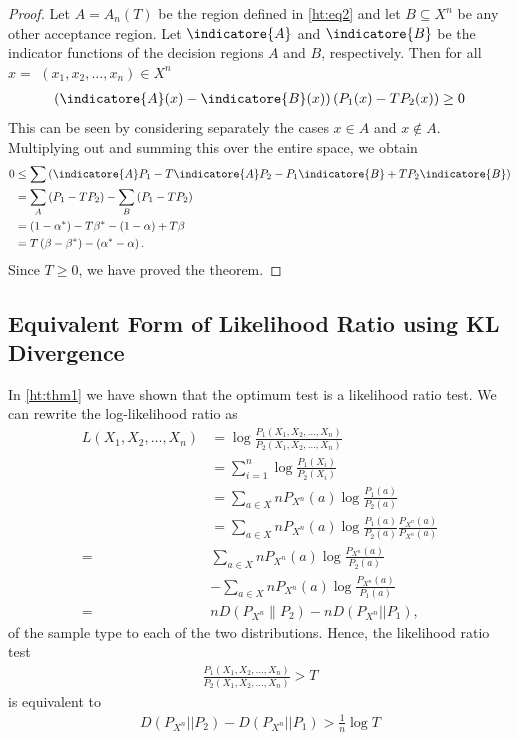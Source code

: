 \documentclass{article}
\begin{document}
\begin{proof}
Let $A=A_{n}(T)$ be the region defined in \cref{ht:eq2} and let $B \subseteq X ^{n}$ be any other acceptance region. Let $\indicatore{A}$ and $\indicatore{B}$ be the indicator functions of the decision regions $A$ and $B$, respectively. Then for all $x =$ $\left(x_{1}, x_{2}, \ldots, x_{n}\right) \in X ^{n}$
\begin{align*}
\left(\indicatore{A}( x )-\indicatore{B}( x )\right)\left(P_{1}( x )-T P_{2}( x )\right) \geq 0
\end{align*}
This can be seen by considering separately the cases $x \in A$ and $x \notin A$. Multiplying out and summing this over the entire space, we obtain
\begin{align*}
0 &\leq \sum\left(\indicatore{A} P_{1}-T \indicatore{A} P_{2}-P_{1} \indicatore{B}+T P_{2} \indicatore{B}\right)\\
&=\sum_{A}\left(P_{1}-T P_{2}\right)-\sum_{B}\left(P_{1}-T P_{2}\right) \\
&=\left(1-\alpha^{*}\right)-T \beta^{*}-(1-\alpha)+T \beta \\
&=T\left(\beta-\beta^{*}\right)-\left(\alpha^{*}-\alpha\right) .
\end{align*}
Since $T \geq 0$, we have proved the theorem.
\end{proof}

\subsection{Equivalent Form of Likelihood Ratio using KL Divergence}\label{ht:ssec2}

In \cref{ht:thm1} we have shown that the optimum test is a likelihood ratio test. We can rewrite the log-likelihood ratio as
\begin{align*}
L\left(X_{1}, X_{2}, \ldots, X_{n}\right) &=\log \frac{P_{1}\left(X_{1}, X_{2}, \ldots, X_{n}\right)}{P_{2}\left(X_{1}, X_{2}, \ldots, X_{n}\right)} \\
&=\sum_{i=1}^{n} \log \frac{P_{1}\left(X_{i}\right)}{P_{2}\left(X_{i}\right)} \\
&=\sum_{a \in X } n P_{X^{n}}(a) \log \frac{P_{1}(a)}{P_{2}(a)} \\
&=\sum_{a \in X } n P_{X^{n}}(a) \log \frac{P_{1}(a)}{P_{2}(a)} \frac{P_{X^{n}}(a)}{P_{X^{n}}(a)}\\
=& \sum_{a \in X } n P_{X^{n}}(a) \log \frac{P_{X^{n}}(a)}{P_{2}(a)} \\
&-\sum_{a \in X } n P_{X^{n}}(a) \log \frac{P_{X^{n}}(a)}{P_{1}(a)} \\
=& n D\left(P_{X^{n}} \| P_{2}\right)-n D\left(P_{X^{n}}|| P_{1}\right),
\end{align*}
 of the sample type to each of the two distributions. Hence, the likelihood ratio test
\begin{align}
\frac{P_{1}\left(X_{1}, X_{2}, \ldots, X_{n}\right)}{P_{2}\left(X_{1}, X_{2}, \ldots, X_{n}\right)}>T \label{ht:eqlrt}
\end{align}
is equivalent to
\begin{align*}
D\left(P_{X^{n}}|| P_{2}\right)-D\left(P_{X^{n}}|| P_{1}\right)>\frac{1}{n} \log T
\end{align*}
\end{document}
